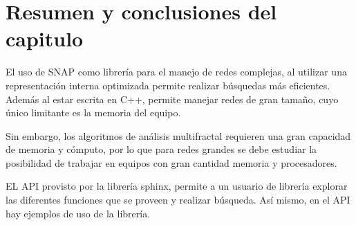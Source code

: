 \section{Resumen y conclusiones del capitulo}

El uso de SNAP como librería para el manejo de redes complejas, al utilizar una representación interna optimizada permite realizar búsquedas más eficientes. Además al estar escrita en C++, permite manejar redes de gran tamaño, cuyo único limitante es la memoria del equipo.

Sin embargo, los algoritmos de análisis multifractal requieren una gran capacidad de memoria y cómputo, por lo que para redes grandes se debe estudiar la posibilidad de trabajar en equipos con gran cantidad memoria y procesadores.

EL API provisto por la librería sphinx, permite a un usuario de librería explorar las diferentes funciones que se proveen y realizar búsqueda. Así mismo, en el API hay ejemplos de uso de la librería.